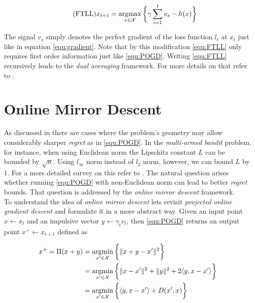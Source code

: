 \begin{equation}
    \tag{FTLL}
    x_{t+1} = \operatorname*{\arg\!\max}_{x \in \mathcal{X}} \bigg\{\gamma\sum_{i=1}^t v_s - h(x)\bigg\}
    \label{equ:FTLL}
\end{equation}

The signal $v_s$ simply denotes the perfect gradient of the loss function $l_t$ at $x_t$ just like in equation \ref{equ:gradient}. Note that by this modification \ref{equ:FTLL} only requires first order information just like \ref{equ:POGD}. Writing \ref{equ:FTLL} recursively leads to the \textit{dual averaging} framework. For more details on that refer to \cite{HDRmertikopoulos, mertikopoulos}.


\section{Online Mirror Descent}\label{section:OnlineMirrorDescent}

As discussed in \cite{shalev, HDRmertikopoulos} there are cases where the problem's geometry may allow considerably sharper \textit{regret} as in \ref{equ:POGD}. In the \textit{multi-armed bandit} problem, for instance, when using Euclidean norm the Lipschitz constant $L$ can be bounded by $\sqrt{n}$. Using $l_\infty$ norm instead of $l_2$ norm, however, we can bound $L$ by $1$. For a more detailed survey on this refer to \cite{shalev, HDRmertikopoulos}. The natural question arises whether running \ref{equ:POGD} with non-Euclidean norm can lead to better \textit{regret} bounds. That question is addressed by the \textit{online mirror descent} framework. \\

To understand the idea of \textit{online mirror descent} lets revisit \textit{projected online gradient descent} and formulate it in a more abstract way. Given an input point $x \gets x_t$ and an impulsive vector $y \gets \gamma_t v_t$, then \ref{equ:POGD} returns an output point $x^+ \gets x_{t+1}$ defined as

\begin{equation}
\begin{split}
x^+ = \Pi(x + y) & = \operatorname*{\arg\!\min}_{x' \in \mathcal{X}}\bigg\{\|x + y - x'\|^2\bigg\} \\
 & = \operatorname*{\arg\!\min}_{x' \in \mathcal{X}}\bigg\{\|x - x'\|^2 + \|y\|^2 + 2\langle y,x-x'\rangle\bigg\} \\
 & = \operatorname*{\arg\!\min}_{x' \in \mathcal{X}}\bigg\{\langle y,x-x'\rangle + D(x',x)\bigg\}
\end{split}
\label{equ:EuclideanProj}
\end{equation}

